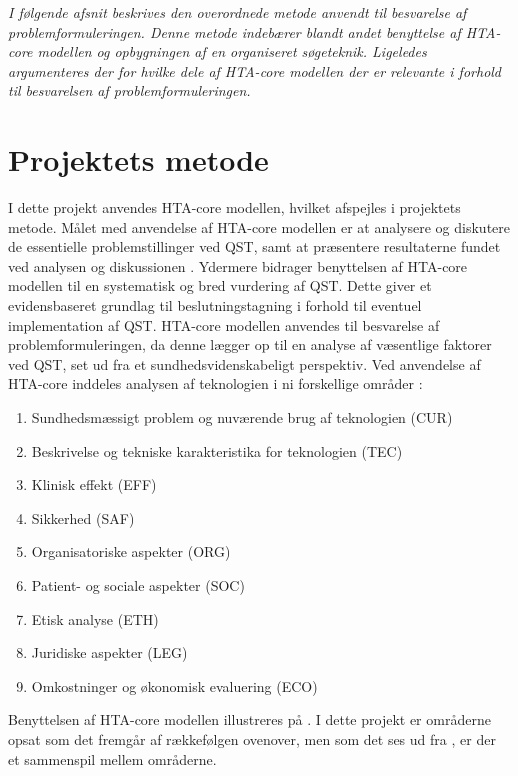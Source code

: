 \textit{I følgende afsnit beskrives den overordnede metode anvendt til besvarelse af problemformuleringen. Denne metode indebærer blandt andet benyttelse af HTA-core modellen og opbygningen af en organiseret søgeteknik. Ligeledes argumenteres der for hvilke dele af HTA-core modellen der er relevante i forhold til besvarelsen af problemformuleringen.}

\section{Projektets metode}
I dette projekt anvendes HTA-core modellen, hvilket afspejles i projektets metode. Målet med anvendelse af HTA-core modellen er at analysere og diskutere de essentielle problemstillinger ved QST, samt at præsentere resultaterne fundet ved analysen og diskussionen \citep{HTAcore}. Ydermere bidrager benyttelsen af HTA-core modellen til en systematisk og bred vurdering af QST. Dette giver et evidensbaseret grundlag til beslutningstagning i forhold til eventuel implementation af QST. \citep{metodehaandbogen} \citep{HTAcore} HTA-core modellen anvendes til besvarelse af problemformuleringen, da denne lægger op til en analyse af væsentlige faktorer ved QST, set ud fra et sundhedsvidenskabeligt perspektiv. Ved anvendelse af HTA-core inddeles analysen af teknologien i ni forskellige områder \citep{HTAcore}:

\begin{enumerate}
\item Sundhedsmæssigt problem og nuværende brug af teknologien (CUR)
\item Beskrivelse og tekniske karakteristika for teknologien (TEC)
\item Klinisk effekt (EFF)
\item Sikkerhed (SAF)
\item Organisatoriske aspekter (ORG)
\item Patient- og sociale aspekter (SOC)
\item Etisk analyse (ETH)
\item Juridiske aspekter (LEG)
\item Omkostninger og økonomisk evaluering (ECO)
\end{enumerate}

Benyttelsen af HTA-core modellen illustreres på . I dette projekt er områderne opsat som det fremgår af rækkefølgen ovenover, men som det ses ud fra , er der et sammenspil mellem områderne. 

